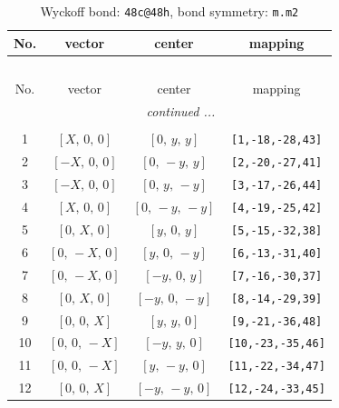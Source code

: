 \documentclass[fleqn,8pt]{jsarticle}
\begin{document}
\renewcommand{\arraystretch}{1.2}
\begin{longtable}{cccc}
\caption{Wyckoff bond: {\tt 48c@48h}, bond symmetry: {\tt m.m2}}
 \\
 \hline \hline
No. & vector & center & mapping \\ \hline \endfirsthead

\multicolumn{3}{l}{\tablename\ \thetable{}} \\
 \hline \hline
No. & vector & center & mapping \\ \hline \endhead

 \hline \hline
\multicolumn{3}{r}{\footnotesize\it continued ...} \\ \endfoot

 \hline \hline
\multicolumn{3}{r}{} \\ \endlastfoot

1 & $\left[ X,\, 0,\, 0 \right]$ & $\left[ 0,\, y,\, y \right]$ & {\tt [1,-18,-28,43]} \\ \hline
2 & $\left[ - X,\, 0,\, 0 \right]$ & $\left[ 0,\, - y,\, y \right]$ & {\tt [2,-20,-27,41]} \\ \hline
3 & $\left[ - X,\, 0,\, 0 \right]$ & $\left[ 0,\, y,\, - y \right]$ & {\tt [3,-17,-26,44]} \\ \hline
4 & $\left[ X,\, 0,\, 0 \right]$ & $\left[ 0,\, - y,\, - y \right]$ & {\tt [4,-19,-25,42]} \\ \hline
5 & $\left[ 0,\, X,\, 0 \right]$ & $\left[ y,\, 0,\, y \right]$ & {\tt [5,-15,-32,38]} \\ \hline
6 & $\left[ 0,\, - X,\, 0 \right]$ & $\left[ y,\, 0,\, - y \right]$ & {\tt [6,-13,-31,40]} \\ \hline
7 & $\left[ 0,\, - X,\, 0 \right]$ & $\left[ - y,\, 0,\, y \right]$ & {\tt [7,-16,-30,37]} \\ \hline
8 & $\left[ 0,\, X,\, 0 \right]$ & $\left[ - y,\, 0,\, - y \right]$ & {\tt [8,-14,-29,39]} \\ \hline
9 & $\left[ 0,\, 0,\, X \right]$ & $\left[ y,\, y,\, 0 \right]$ & {\tt [9,-21,-36,48]} \\ \hline
10 & $\left[ 0,\, 0,\, - X \right]$ & $\left[ - y,\, y,\, 0 \right]$ & {\tt [10,-23,-35,46]} \\ \hline
11 & $\left[ 0,\, 0,\, - X \right]$ & $\left[ y,\, - y,\, 0 \right]$ & {\tt [11,-22,-34,47]} \\ \hline
12 & $\left[ 0,\, 0,\, X \right]$ & $\left[ - y,\, - y,\, 0 \right]$ & {\tt [12,-24,-33,45]} \\
\end{longtable}
\end{document}
